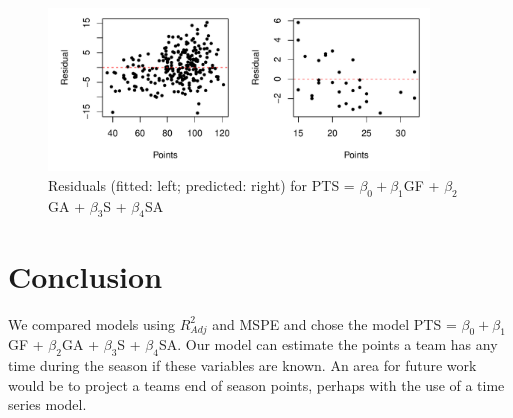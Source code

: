 \documentclass[12pt]{article}
\begin{document}
\begin{figure}[!ht]
\begin{center}
\includegraphics[width=0.9\textwidth]{report-residual_plots}
\end{center}
\vspace{-9mm}
\caption{{\small Residuals (fitted: left; predicted: right) for PTS = $\beta_{0} + \beta_{1}$GF + $\beta_{2}$GA + $\beta_{3}$S + $\beta_{4}$SA}}
\end{figure}

\vspace{-7mm}
\section{Conclusion}

We compared models using $R^{2}_{Adj}$ and MSPE and chose the model PTS = $\beta_{0} + \beta_{1}$GF + $\beta_{2}$GA + $\beta_{3}$S + $\beta_{4}$SA. Our model can estimate the points a team has any time during the season if these variables are known. An area for future work would be to project a teams end of season points, perhaps with the use of a time series model.
\end{document}
